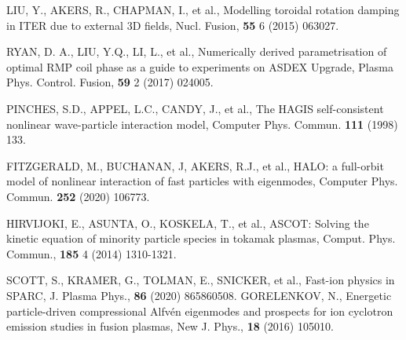 \documentclass[10pt, a4paper, twoside]{article}
\begin{document}
\begin{thebibliography}{9}
    LIU, Y., AKERS, R., CHAPMAN, I., et al.,
    Modelling toroidal rotation damping in ITER due to external 3D fields,
    Nucl. Fusion,
    \textbf{55} 6
    (2015)
    063027.

    RYAN, D. A., LIU, Y.Q., LI, L., et al.,
    Numerically derived parametrisation of optimal RMP coil phase as a guide to experiments on ASDEX Upgrade,
    Plasma Phys. Control. Fusion,
    \textbf{59} 2 
    (2017) 
    024005.

    PINCHES, S.D., APPEL, L.C., CANDY, J., et al.,
    The HAGIS self-consistent nonlinear wave-particle interaction model,
    Computer Phys. Commun.
    \textbf{111}
    (1998)
    133.

    FITZGERALD, M., BUCHANAN, J, AKERS, R.J., et al.,
    HALO: a full-orbit model of nonlinear interaction of fast particles with eigenmodes,
    Computer Phys. Commun.
    \textbf{252}
    (2020)
    106773.

    HIRVIJOKI, E., ASUNTA, O., KOSKELA, T., et al.,
    ASCOT: Solving the kinetic equation of minority particle species in tokamak plasmas,
    Comput. Phys. Commun.,
    \textbf{185} 4 
    (2014) 
    1310-1321.

    SCOTT, S., KRAMER, G., TOLMAN, E., SNICKER, et al.,
    Fast-ion physics in SPARC,
    J. Plasma Phys.,
    \textbf{86}
    (2020) 
    865860508.
    GORELENKOV, N.,
    Energetic particle-driven compressional Alfv\'en eigenmodes and prospects for ion cyclotron emission studies in fusion plasmas,
    New J. Phys.,
    \textbf{18}
    (2016) 
    105010.



\end{thebibliography}
\end{document}
